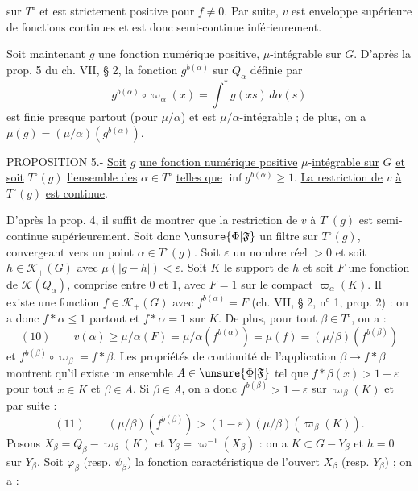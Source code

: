 sur $T^\circ$ et est strictement positive pour $f\ne 0$. Par suite, $v$ est enveloppe supérieure de fonctions continues et est donc semi-continue inférieurement.

Soit maintenant $g$ une fonction numérique positive, $\mu$-intégrable sur $G$. D'après la prop. 5 du ch. VII, § 2, la fonction $g^{b(\alpha)}$ sur $Q_\alpha$ définie par
\[
g^{b(\alpha)}\circ\varpi_\alpha(x)=\int^*g(xs)\,d\alpha(s)
\]
est finie presque partout (pour $\mu/\alpha$) et est $\mu/\alpha$-intégrable ; de plus, on a $\mu(g)=(\mu/\alpha)(g^{b(\alpha)})$.

PROPOSITION 5.- \uline{Soit} $g$ \uline{une fonction numérique positive} $\mu$-\uline{intégrable sur} $G$ \uline{et soit} $T^\circ(g)$ \uline{l'ensemble des} $\alpha\in T^\circ$ \uline{telles que} $\inf g^{b(\alpha)}\geq 1$. \uline{La restriction de} $v$ \uline{à} $T^\circ(g)$ \uline{est continue}.

D'après la prop. 4, il suffit de montrer que la restriction de $v$ à $T^\circ(g)$ est semi-continue supérieurement. Soit donc $\unsure{\Phi|\mathfrak F}$ un filtre sur $T^\circ(g)$, convergeant vers un point $\alpha\in T^\circ(g)$. Soit $\varepsilon$ un nombre réel $>0$ et soit $h\in\mathcal K_+(G)$ avec $\mu(|g-h|)<\varepsilon$. Soit $K$ le support de $h$ et soit $F$ une fonction de $\mathcal K(Q_\alpha)$, comprise entre 0 et 1, avec $F=1$ sur le compact $\varpi_\alpha(K)$. Il existe une fonction $f\in\mathcal K_+(G)$ avec $f^{b(\alpha)}=F$ (ch. VII, § 2, n° 1, prop. 2) : on a donc $f*\alpha\leq 1$ partout et $f*\alpha=1$ sur $K$. De plus, pour tout $\beta\in T^\circ$, on a :
\[
(10)\qquad v(\alpha)\geq\mu/\alpha(F)=\mu/\alpha(f^{b(\alpha)})=\mu(f)=(\mu/\beta)(f^{b(\beta)})
\]
et $f^{b(\beta)}\circ\varpi_\beta=f*\beta$. Les propriétés de continuité de l'application $\beta\longrightarrow f*\beta$ montrent qu'il existe un ensemble $A\in\unsure{\Phi|\mathfrak F}$ tel que $f*\beta(x)>1-\varepsilon$ pour tout $x\in K$ et $\beta\in A$. Si $\beta\in A$, on a donc $f^{b(\beta)}>1-\varepsilon$ sur $\varpi_\beta(K)$ et par suite :
\[
(11)\qquad (\mu/\beta)(f^{b(\beta)})>(1-\varepsilon)(\mu/\beta)(\varpi_\beta(K)).
\]
Posons $X_\beta=Q_\beta-\varpi_\beta(K)$ et $Y_\beta=\varpi^{-1}(X_\beta)$ : on a $K\subset G-Y_\beta$ et $h=0$ sur $Y_\beta$.
Soit $\varphi_\beta$ (resp. $\psi_\beta$) la fonction caractéristique de l'ouvert $X_\beta$ (resp. $Y_\beta$) ; on a :

